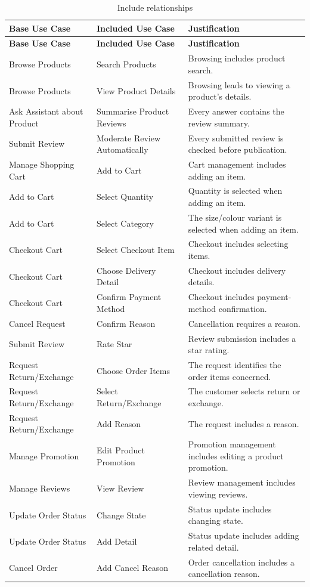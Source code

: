 \documentclass[11pt,a4paper,oneside]{extreport}
\newif\ifshowvtwo
\newcommand{\vtwocolor}{\ifshowvtwo\color{red}\fi}
\newcommand{\R}{\leavevmode\vtwocolor}   %
\begin{document}
{\small
\begin{xltabular}{\textwidth}{@{}L{3.6cm} L{3.6cm} Y@{}}
\caption{Include relationships}\label{tab:include}\\
\toprule
\textbf{Base Use Case} & \textbf{Included Use Case} & \textbf{Justification} \\ \midrule
\endfirsthead
\toprule
\textbf{Base Use Case} & \textbf{Included Use Case} & \textbf{Justification} \\ \midrule
\endhead
\bottomrule
\endlastfoot
Browse Products & Search Products & Browsing includes product search. \\
Browse Products & View Product Details & Browsing leads to viewing a product's details. \\
\R Ask Assistant about Product & \R Summarise Product Reviews & \R Every answer contains the review summary. \\
\R Submit Review & \R Moderate Review Automatically & \R Every submitted review is checked before publication. \\
Manage Shopping Cart & Add to Cart & Cart management includes adding an item. \\
Add to Cart & Select Quantity & Quantity is selected when adding an item. \\
Add to Cart & Select Category & The size/colour variant is selected when adding an item. \\
Checkout Cart & Select Checkout Item & Checkout includes selecting items. \\
Checkout Cart & Choose Delivery Detail & Checkout includes delivery details. \\
Checkout Cart & Confirm Payment Method & Checkout includes payment-method confirmation. \\
Cancel Request & Confirm Reason & Cancellation requires a reason. \\
Submit Review & Rate Star & Review submission includes a star rating. \\
Request Return/Exchange & Choose Order Items & The request identifies the order items concerned. \\
Request Return/Exchange & Select Return/Exchange & The customer selects return or exchange. \\
Request Return/Exchange & Add Reason & The request includes a reason. \\
Manage Promotion & Edit Product Promotion & Promotion management includes editing a product promotion. \\
Manage Reviews & View Review & Review management includes viewing reviews. \\
Update Order Status & Change State & Status update includes changing state. \\
Update Order Status & Add Detail & Status update includes adding related detail. \\
Cancel Order & Add Cancel Reason & Order cancellation includes a cancellation reason. \\
\end{xltabular}

}
\end{document}
